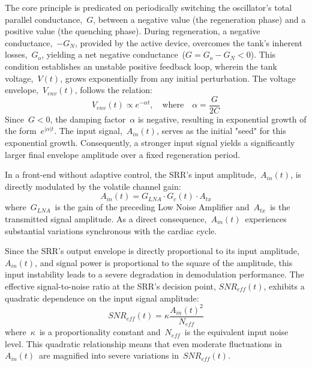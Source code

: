\documentclass[journal]{IEEEtran}
\begin{document}
The core principle is predicated on periodically switching the oscillator's total parallel conductance,~$G$, between a negative value (the regeneration phase) and a positive value (the quenching phase). During regeneration, a negative conductance,~$-G_N$, provided by the active device, overcomes the tank's inherent losses,~$G_o$, yielding a net negative conductance~($G = G_o - G_N < 0$). This condition establishes an unstable positive feedback loop, wherein the tank voltage,~$V(t)$, grows exponentially from any initial perturbation. The voltage envelope,~$V_{env}(t)$, follows the relation:
\begin{equation}
    V_{env}(t) \propto e^{-\alpha t}, \quad \text{where} \quad \alpha = \frac{G}{2C}
    \label{eq:srr_growth}
\end{equation}
Since~$G < 0$, the damping factor~$\alpha$ is negative, resulting in exponential growth of the form~$e^{|\alpha|t}$. The input signal,~$A_{in}(t)$, serves as the initial "seed" for this exponential growth. Consequently, a stronger input signal yields a significantly larger final envelope amplitude over a fixed regeneration period.

In a front-end without adaptive control, the SRR's input amplitude,~$A_{in}(t)$, is directly modulated by the volatile channel gain:
\begin{equation}
    A_{in}(t) = G_{LNA} \cdot G_c(t) \cdot A_{tx}
    \label{eq:ain_channel}
\end{equation}
where~$G_{LNA}$~is the gain of the preceding Low Noise Amplifier and~$A_{tx}$~is the transmitted signal amplitude. As a direct consequence,~$A_{in}(t)$~experiences substantial variations synchronous with the cardiac cycle.

Since the SRR's output envelope is directly proportional to its input amplitude, $A_{in}(t)$, and signal power is proportional to the square of the amplitude, this input instability leads to a severe degradation in demodulation performance. The effective signal-to-noise ratio at the SRR's decision point, $SNR_{eff}(t)$, exhibits a quadratic dependence on the input signal amplitude:
\begin{equation}
    SNR_{eff}(t) = \kappa \frac{A_{in}(t)^2}{N_{eff}}
    \label{eq:snr_squared}
\end{equation}
where~$\kappa$~is a proportionality constant and~$N_{eff}$~is the equivalent input noise level. This quadratic relationship means that even moderate fluctuations in~$A_{in}(t)$~are magnified into severe variations in~$SNR_{eff}(t)$.
\end{document}
